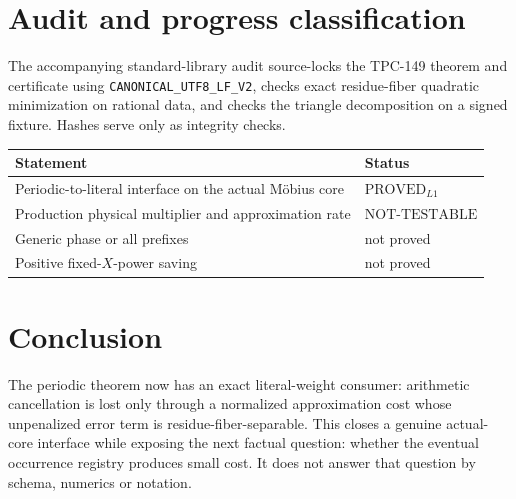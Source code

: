 \documentclass[11pt]{article}
\theoremstyle{definition}
\begin{document}
\section{Audit and progress classification}

The accompanying standard-library audit source-locks the TPC-149
theorem and certificate using \texttt{CANONICAL\_UTF8\_LF\_V2},
checks exact residue-fiber quadratic minimization on rational data,
and checks the triangle decomposition on a signed fixture.  Hashes
serve only as integrity checks.

\begin{center}
\begin{tabular}{ll}
\hline
Statement & Status\\
\hline
Periodic-to-literal interface on the actual M\"obius core
  & \(\mathrm{PROVED}_{L1}\)\\
Production physical multiplier and approximation rate
  & \(\mathrm{NOT\mbox{-}TESTABLE}\)\\
Generic phase or all prefixes & not proved\\
Positive fixed-\(X\)-power saving & not proved\\
\hline
\end{tabular}
\end{center}

\section{Conclusion}

The periodic theorem now has an exact literal-weight consumer:
arithmetic cancellation is lost only through a normalized
approximation cost whose unpenalized error term is
residue-fiber-separable.  This closes a genuine
actual-core interface while exposing the next factual question:
whether the eventual occurrence registry produces small cost.  It
does not answer that question by schema, numerics or notation.



\end{document}
